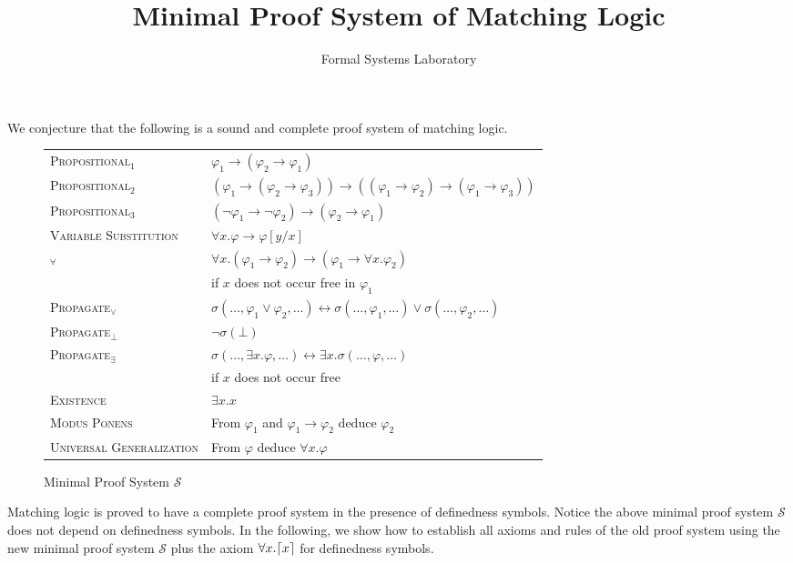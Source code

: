 \documentclass{article}
\title{Minimal Proof System of Matching Logic}
\author{Formal Systems Laboratory}
\newcommand{\imp}{\rightarrow}
\newcommand{\dimp}{\leftrightarrow}
\DeclarePairedDelimiter\ceil{\lceil}{\rceil}
\newcommand{\miniPS}{\mathcal{S}}
\begin{document}
	\maketitle

We conjecture that the following is a sound and complete proof system of 
matching logic. 
\begin{figure}[hbtp]
\def\arraystretch{1.25}
\begin{longtable}{ll}
	 \textsc{Propositional$_1$}
  &  $\varphi_1 \imp (\varphi_2 \imp \varphi_1)$
  \\
     \textsc{Propositional$_2$}
  &  $(\varphi_1 \imp (\varphi_2 \imp \varphi_3)) 
      \imp ((\varphi_1 \imp \varphi_2) \imp (\varphi_1 \imp \varphi_3))$
  \\
     \textsc{Propositional$_3$}
  &  $(\neg \varphi_1 \imp \neg \varphi_2) \imp (\varphi_2 \imp \varphi_1)$
  \\
     \textsc{Variable Substitution}
  &  $\forall x . \varphi \imp \varphi[y/x]$
  \\
     \textsc{$_\forall$}
  &  $\forall x . (\varphi_1 \imp \varphi_2) 
     \imp (\varphi_1 \imp \forall x . \varphi_2)$
  \\
  &
     if $x$ does not occur free in $\varphi_1$
  \\
     \textsc{Propagate$_\vee$}
  &  $\sigma(\dots,\varphi_1 \vee \varphi_2,\dots) 
      \dimp
      \sigma(\dots,\varphi_1,\dots) \vee \sigma(\dots,\varphi_2,\dots)$
  \\
     \textsc{Propagate$_\bot$}
　　&  $\neg \sigma(\bot)$
　　\\
     \textsc{Propagate$_\exists$}
  &  $\sigma(\dots,\exists x . \varphi,\dots) \dimp \exists x . 
      \sigma(\dots, \varphi,\dots)$
  \\
  &
     if $x$ does not occur free
  \\
    \textsc{Existence}
  & $\exists x . x$
  \\
    \textsc{Modus Ponens}
  &  From $\varphi_1$ and $\varphi_1 \imp \varphi_2$ deduce $\varphi_2$
  \\
    \textsc{Universal Generalization}
  &  From $\varphi$ deduce $\forall x . \varphi$
\end{longtable}
\caption{Minimal Proof System $\miniPS$}
\end{figure}

Matching logic is proved to have a complete proof system in the presence of 
definedness symbols.
Notice the above minimal proof system $\miniPS$ does not depend on definedness 
symbols.
In the following, we show how to establish all axioms and rules of the old 
proof system using the new minimal proof system $\miniPS$ plus the 
axiom $\forall x . \ceil{x}$ for definedness symbols.
\end{document}
